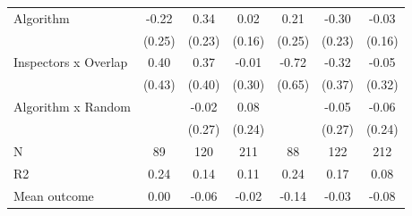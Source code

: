 \begin{tabular}{lccc|ccc}
Algorithm   &       -0.22         &        0.34         &        0.02         &        0.21         &       -0.30         &       -0.03         \\
            &      (0.25)         &      (0.23)         &      (0.16)         &      (0.25)         &      (0.23)         &      (0.16)         \\
\addlinespace
Inspectors x Overlap&        0.40         &        0.37         &       -0.01         &       -0.72         &       -0.32         &       -0.05         \\
            &      (0.43)         &      (0.40)         &      (0.30)         &      (0.65)         &      (0.37)         &      (0.32)         \\
\addlinespace
Algorithm x Random&                     &       -0.02         &        0.08         &                     &       -0.05         &       -0.06         \\
            &                     &      (0.27)         &      (0.24)         &                     &      (0.27)         &      (0.24)         \\
\midrule
N           &          89         &         120         &         211         &          88         &         122         &         212         \\
R2          &        0.24         &        0.14         &        0.11         &        0.24         &        0.17         &        0.08         \\
Mean outcome&        0.00         &       -0.06         &       -0.02         &       -0.14         &       -0.03         &       -0.08         \\
\bottomrule \end{tabular}
